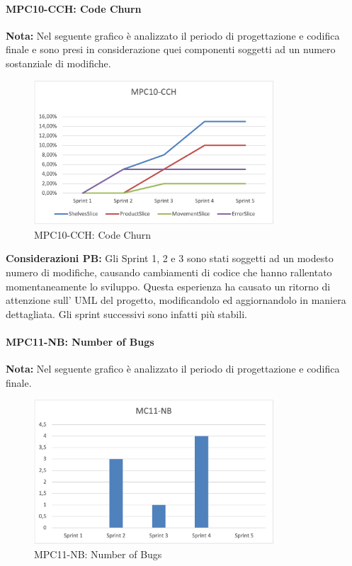\newpage
\paragraph{MPC10-CCH: Code Churn}

\textbf{Nota:} Nel seguente grafico è analizzato il periodo di progettazione e codifica finale e sono presi in considerazione quei componenti soggetti ad un numero sostanziale di modifiche.

\begin{figure}[h!] 
    \centering
    \includegraphics[width=0.8\textwidth]{images/MPC10-CCH.png}
    \caption{MPC10-CCH: Code Churn}
\end{figure}

\noindent \textbf{Considerazioni PB:} Gli Sprint 1, 2 e 3 sono stati soggetti ad un modesto numero di modifiche, causando cambiamenti di codice che hanno rallentato momentaneamente lo sviluppo. Questa esperienza ha causato un ritorno di attenzione sull' UML del progetto, modificandolo ed aggiornandolo in maniera dettagliata. Gli sprint successivi sono infatti più stabili.


\paragraph{MPC11-NB: Number of Bugs}
\textbf{Nota:} Nel seguente grafico è analizzato il periodo di progettazione e codifica finale.
\begin{figure}[h!] 
    \centering
    \includegraphics[width=0.8\textwidth]{images/MPC11-NB.png}
    \caption{MPC11-NB: Number of Bugs}
\end{figure}

